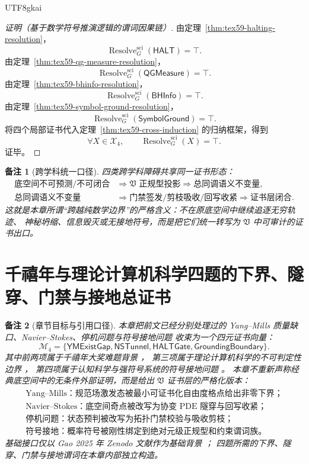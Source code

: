 \documentclass[12pt]{article}
\newtheorem{remark}{备注}[section]
\newcommand{\Vsys}{\mathfrak V}
\DeclareMathOperator{\Resolve}{Resolve}
\begin{document}
\begin{CJK*}{UTF8}{gkai}
\begin{proof}[证明（基于数学符号推演逻辑的谓词因果链）]
由定理~\ref{thm:tex59-halting-resolution}，
\[
  \Resolve_G^{\mathrm{sci}}(\mathsf{HALT})=\top.
\]
由定理~\ref{thm:tex59-qg-measure-resolution}，
\[
  \Resolve_G^{\mathrm{sci}}(\mathsf{QGMeasure})=\top.
\]
由定理~\ref{thm:tex59-bhinfo-resolution}，
\[
  \Resolve_G^{\mathrm{sci}}(\mathsf{BHInfo})=\top.
\]
由定理~\ref{thm:tex59-symbol-ground-resolution}，
\[
  \Resolve_G^{\mathrm{sci}}(\mathsf{SymbolGround})=\top.
\]
将四个局部证书代入定理~\ref{thm:tex59-cross-induction} 的归纳框架，得到
\[
  \forall X\in\mathcal X_4,\qquad
  \Resolve_G^{\mathrm{sci}}(X)=\top.
\]
证毕。
\end{proof}

\begin{remark}[跨学科统一口径]
四类跨学科障碍共享同一证书形态：
\[
  \begin{aligned}
  \text{底空间不可预测/不可闭合}
  &\Longrightarrow
  \text{\(\Vsys\) 正规型投影}
  \Longrightarrow
  \text{总同调语义不变量},\\
  \text{总同调语义不变量}
  &\Longrightarrow
  \text{门禁签发/剪枝吸收/回写收紧}
  \Longrightarrow
  \text{证书层闭合}.
  \end{aligned}
\]
这就是本章所谓“跨越纯数学边界”的严格含义：不在原底空间中继续追逐无穷轨迹、
神秘坍缩、信息毁灭或无接地符号，而是把它们统一转写为 \(\Vsys\) 中可审计的证书出口。
\end{remark}

\section{千禧年与理论计算机科学四题的下界、隧穿、门禁与接地总证书}
\label{sec:tex59-millennium-cs-ai-bridge}

\begin{remark}[章节目标与引用口径]
本章把前文已经分别处理过的 Yang--Mills 质量缺口、Navier--Stokes、停机问题与符号接地问题
收束为一个四元证书向量：
\[
  \mathcal M_4
  =
  \{\mathsf{YMExistGap},\mathsf{NSTunnel},\mathsf{HALTGate},\mathsf{GroundingBoundary}\}.
\]
其中前两项属于千禧年大奖难题背景 \cite{JaffeWitten2000YM,Fefferman2000NS}，
第三项属于理论计算机科学的不可判定性边界 \cite{Turing1936Computable}，
第四项属于认知科学与强符号系统的符号接地问题 \cite{Harnad1990SymbolGrounding}。
本章不重新声称经典底空间中的无条件外部证明，而是给出 \(\Vsys\) 证书层的严格化版本：
\[
  \boxed{
  \begin{gathered}
  \text{Yang--Mills：规范场激发态被最小可证书化自由度格点给出非零下界；}\\
  \text{Navier--Stokes：底空间奇点被改写为协变 PDE 隧穿与回写收紧；}\\
  \text{停机问题：状态预判被改写为拓扑门禁校验与吸收剪枝；}\\
  \text{符号接地：概率符号被刚性绑定到绝对元级正规型和约束谓词族。}
  \end{gathered}
  }
\]
基础接口仅以 Gao 2025 年 Zenodo 文献作为基础背景 \cite{Gao2025PureMathZenodo}；
四题所需的下界、隧穿、门禁与接地谓词在本章内部独立构造。
\end{remark}


\end{CJK*}
\end{document}
